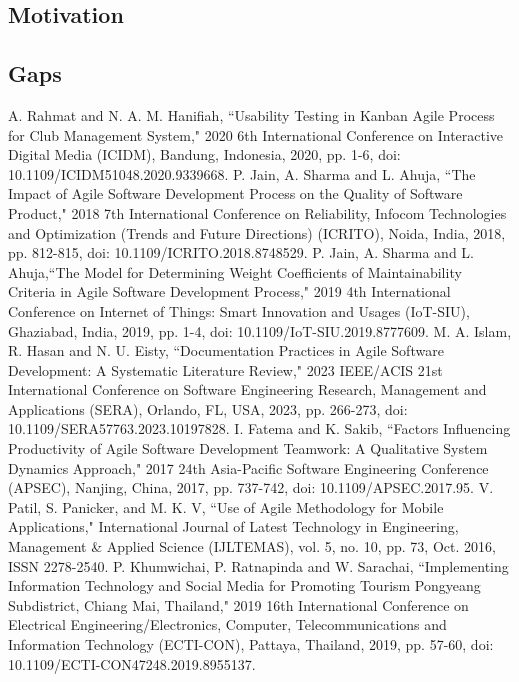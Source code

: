 \documentclass[conference]{IEEEtran}
\begin{document}
\subsection{Motivation}


\subsection{Gaps}

\begin{thebibliography}{00}
     A. Rahmat and N. A. M. Hanifiah, ``Usability Testing in Kanban Agile Process for Club Management System," 2020 6th International Conference on Interactive Digital Media (ICIDM), Bandung, Indonesia, 2020, pp. 1-6, doi: 10.1109/ICIDM51048.2020.9339668. 
     P. Jain, A. Sharma and L. Ahuja, ``The Impact of Agile Software Development Process on the Quality of Software Product," 2018 7th International Conference on Reliability, Infocom Technologies and Optimization (Trends and Future Directions) (ICRITO), Noida, India, 2018, pp. 812-815, doi: 10.1109/ICRITO.2018.8748529. 
     P. Jain, A. Sharma and L. Ahuja,``The Model for Determining Weight Coefficients of Maintainability Criteria in Agile Software Development Process," 2019 4th International Conference on Internet of Things: Smart Innovation and Usages (IoT-SIU), Ghaziabad, India, 2019, pp. 1-4, doi: 10.1109/IoT-SIU.2019.8777609. 
     M. A. Islam, R. Hasan and N. U. Eisty, ``Documentation Practices in Agile Software Development: A Systematic Literature Review," 2023 IEEE/ACIS 21st International Conference on Software Engineering Research, Management and Applications (SERA), Orlando, FL, USA, 2023, pp. 266-273, doi: 10.1109/SERA57763.2023.10197828. 
     I. Fatema and K. Sakib, ``Factors Influencing Productivity of Agile Software Development Teamwork: A Qualitative System Dynamics Approach," 2017 24th Asia-Pacific Software Engineering Conference (APSEC), Nanjing, China, 2017, pp. 737-742, doi: 10.1109/APSEC.2017.95. 
     V. Patil, S. Panicker, and M. K. V, ``Use of Agile Methodology for Mobile Applications," International Journal of Latest Technology in Engineering, Management \& Applied Science (IJLTEMAS), vol. 5, no. 10, pp. 73, Oct. 2016, ISSN 2278-2540.
     P. Khumwichai, P. Ratnapinda and W. Sarachai, ``Implementing Information Technology and Social Media for Promoting Tourism Pongyeang Subdistrict, Chiang Mai, Thailand," 2019 16th International Conference on Electrical Engineering/Electronics, Computer, Telecommunications and Information Technology (ECTI-CON), Pattaya, Thailand, 2019, pp. 57-60, doi: 10.1109/ECTI-CON47248.2019.8955137.

\end{thebibliography}
\end{document}
